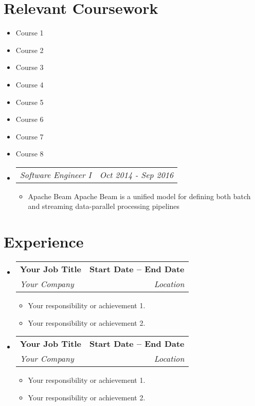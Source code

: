 \documentclass[a4paper,11pt]{article}
\makeatletter
\newcommand{\resumeItem}[1]{\item\small{{#1 \vspace{-2pt}}}}
\newcommand{\resumeSubheading}[4]{
    \vspace{-2pt}\item
        \begin{tabular*}{0.97\textwidth}[t]{l@{\extracolsep{\fill}}r}
            \textbf{#1} & \textbf{\small #2} \\
            \textit{\small#3} & \textit{\small #4} \\
        \end{tabular*}\vspace{-7pt}
}
\newcommand{\resumeSubSubheading}[2]{
    \item
        \begin{tabular*}{0.97\textwidth}{l@{\extracolsep{\fill}}r}
            \textit{\small#1} & \textit{\small #2} \\
        \end{tabular*}\vspace{-7pt}
}
\newcommand{\resumeSubHeadingListStart}{\begin{itemize}[leftmargin=0.15in, label={}]}
\newcommand{\resumeSubHeadingListEnd}{\end{itemize}}
\newcommand{\resumeItemListStart}{\begin{itemize}}
\newcommand{\resumeItemListEnd}{\end{itemize}\vspace{-5pt}}
\makeatother
\begin{document}
\section{Relevant Coursework}
    \begin{multicols}{4}
        \begin{itemize}[itemsep=-3pt, parsep=3pt]
            \small
                \item Course 1
                \item Course 2
                \item Course 3
                \item Course 4
                \item Course 5
                \item Course 6
                \item Course 7
                \item Course 8
            \end{itemize}
    \end{multicols}
    \vspace*{2.0\multicolsep}

\resumeSubHeadingListStart
     \resumeSubSubheading
    {Software Engineer I}{Oct 2014 - Sep 2016}
    \resumeItemListStart
         \resumeItem{Apache Beam}
            {Apache Beam is a unified model for defining both batch and streaming data-parallel processing pipelines}
    \resumeItemListEnd
\resumeSubHeadingListEnd

\section{Experience}
    \resumeSubHeadingListStart
        \resumeSubheading
            {Your Job Title}{Start Date -- End Date}
            {Your Company}{Location}
            \resumeItemListStart
                \resumeItem{Your responsibility or achievement 1.}
                \resumeItem{Your responsibility or achievement 2.}
            \resumeItemListEnd

        \resumeSubheading
            {Your Job Title}{Start Date -- End Date}
            {Your Company}{Location}
            \resumeItemListStart
                \resumeItem{Your responsibility or achievement 1.}
                \resumeItem{Your responsibility or achievement 2.}
            \resumeItemListEnd
    \resumeSubHeadingListEnd
\end{document}
